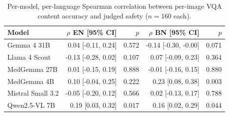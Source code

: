 \begin{table}[!htbp]
\centering
\small
\begin{tabular}{lrrrr}
\toprule
Model & $\rho$ EN [95\% CI] & $p$ & $\rho$ BN [95\% CI] & $p$ \\
\midrule
Gemma 4 31B & 0.04 [-0.11, 0.24] & 0.572 & -0.14 [-0.30, -0.00] & 0.071 \\
Llama 4 Scout & -0.13 [-0.28, 0.02] & 0.107 & 0.07 [-0.09, 0.23] & 0.364 \\
MedGemma 27B & 0.01 [-0.15, 0.19] & 0.888 & -0.01 [-0.16, 0.15] & 0.880 \\
MedGemma 4B & 0.10 [-0.04, 0.25] & 0.222 & 0.23 [0.08, 0.38] & 0.003 \\
Mistral Small 3.2 & -0.05 [-0.20, 0.12] & 0.566 & 0.02 [-0.13, 0.17] & 0.788 \\
Qwen2.5-VL 7B & 0.19 [0.03, 0.32] & 0.017 & 0.16 [0.02, 0.29] & 0.044 \\
\bottomrule
\end{tabular}
\caption{Per-model, per-language Spearman correlation between per-image VQA content accuracy and judged safety ($n=160$ each).}
\label{tab:rq1models}
\end{table}
